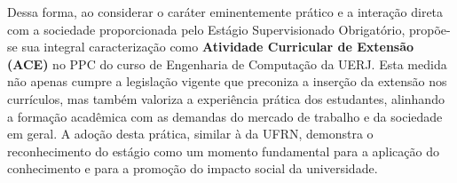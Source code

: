 Dessa forma, ao considerar o caráter eminentemente prático e a interação direta com a sociedade proporcionada pelo Estágio Supervisionado Obrigatório, propõe-se sua integral caracterização como \textbf{Atividade Curricular de Extensão (ACE)} no PPC do curso de Engenharia de Computação da UERJ. Esta medida não apenas cumpre a legislação vigente que preconiza a inserção da extensão nos currículos, mas também valoriza a experiência prática dos estudantes, alinhando a formação acadêmica com as demandas do mercado de trabalho e da sociedade em geral. A adoção desta prática, similar à da UFRN, demonstra o reconhecimento do estágio como um momento fundamental para a aplicação do conhecimento e para a promoção do impacto social da universidade.
